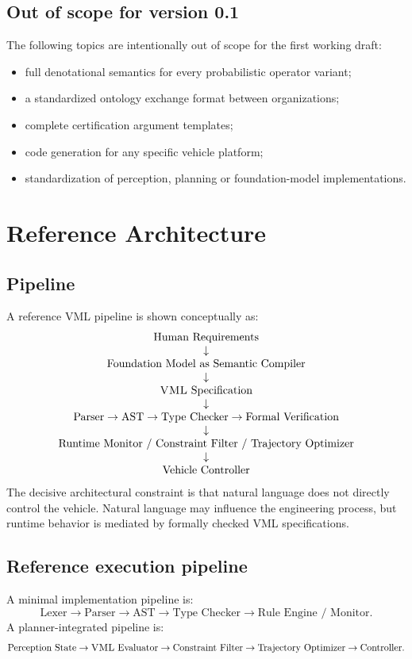 \documentclass[11pt,a4paper]{article}
\newcommand{\VML}{\textsc{VML}}
\begin{document}
\subsection{Out of scope for version 0.1}
The following topics are intentionally out of scope for the first working draft:
\begin{itemize}
  \item full denotational semantics for every probabilistic operator variant;
  \item a standardized ontology exchange format between organizations;
  \item complete certification argument templates;
  \item code generation for any specific vehicle platform;
  \item standardization of perception, planning or foundation-model implementations.
\end{itemize}

\section{Reference Architecture}
\subsection{Pipeline}
A reference \VML{} pipeline is shown conceptually as:
\[
\begin{array}{c}
\text{Human Requirements} \\
\downarrow \\
\text{Foundation Model as Semantic Compiler} \\
\downarrow \\
\VML{}\ \text{Specification} \\
\downarrow \\
\text{Parser}\rightarrow\text{AST}\rightarrow\text{Type Checker}\rightarrow\text{Formal Verification} \\
\downarrow \\
\text{Runtime Monitor / Constraint Filter / Trajectory Optimizer} \\
\downarrow \\
\text{Vehicle Controller}
\end{array}
\]
The decisive architectural constraint is that natural language does not directly control the vehicle. Natural language may influence the engineering process, but runtime behavior is mediated by formally checked \VML{} specifications.

\subsection{Reference execution pipeline}
A minimal implementation pipeline is:
\[
  \text{Lexer} \rightarrow \text{Parser} \rightarrow \text{AST} \rightarrow \text{Type Checker} \rightarrow \text{Rule Engine / Monitor}.
\]
A planner-integrated pipeline is:
\[
  \text{Perception State} \rightarrow \VML{}\ \text{Evaluator} \rightarrow \text{Constraint Filter} \rightarrow \text{Trajectory Optimizer} \rightarrow \text{Controller}.
\]
\end{document}
